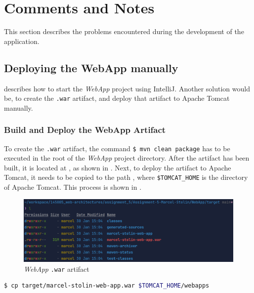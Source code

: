\newpage
\section{Comments and Notes}\label{sec:04_comments}
This section describes the problems encountered during the development of the application.


\subsection{Deploying the WebApp manually}\label{sec:04_comments_webapp}
 describes how to start the \textit{WebApp} project using IntelliJ. Another solution would be, to create the \texttt{.war} artifact, and deploy that artifact to Apache Tomcat manually.

\subsubsection{Build and Deploy the WebApp Artifact}\label{sec:04_comments_webapp_artifact}
To create the \texttt{.war} artifact, the command \texttt{\$ mvn clean package} has to be executed in the root of the \textit{WebApp} project directory.
After the artifact has been built, it is located at , as shown in . Next, to deploy the artifact to Apache Tomcat, it needs to be copied to the path , where \texttt{\$TOMCAT\_HOME} is the directory of Apache Tomcat. This process is shown in .

\begin{figure}[h]
\centering
\includegraphics[scale=0.2]{images/04_comments/webapp-artifact}
\caption{\textit{WebApp} \texttt{.war} artifact}
\label{fig:04_comments_webapp_artifact_created}
\end{figure}

\begin{lstlisting}[label=lst:04_comments_webapp_artifact_deploy, caption=Artifact deployment command, language=sh]
$ cp target/marcel-stolin-web-app.war $TOMCAT_HOME/webapps
\end{lstlisting}

